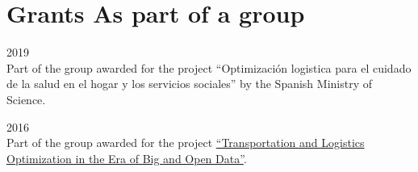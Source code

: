 \section*{Grants \small{As part of a group}}

\begin{paracol}{2}
  \textsc{2019}
\switchcolumn
  \\
  Part of the group awarded for the project ``Optimización logistica para el cuidado de la salud en el hogar y los servicios sociales'' by the Spanish Ministry of Science.
\end{paracol}

\begin{paracol}{2}
  \textsc{2016}
\switchcolumn
  \\
  Part of the group awarded for the project \href{https://santini.in/files/cv/prin16.pdf}{``Transportation and Logistics Optimization in the Era of Big and Open Data''}.
\end{paracol}